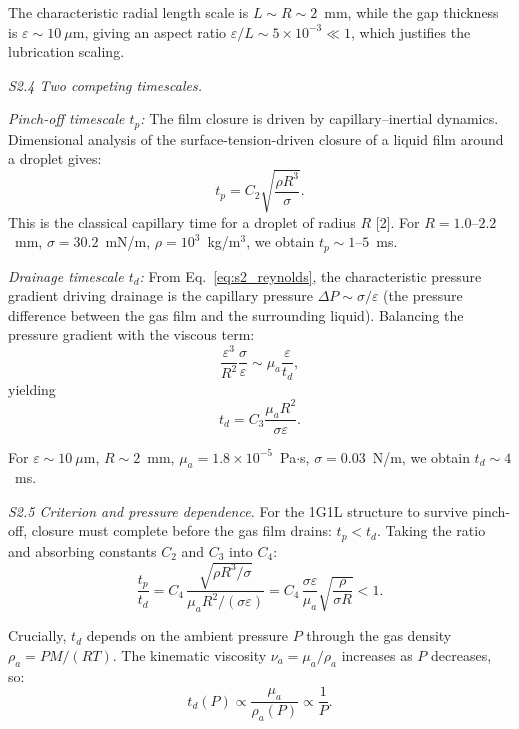 \documentclass[%
 preprint,
 superscriptaddress,
 amsmath,amssymb,
 aps, prl,
]{revtex4-2}
\begin{document}
The characteristic radial length scale is $L \sim R \sim 2$~mm, while the gap thickness is $\varepsilon \sim 10~\mu\text{m}$, giving an aspect ratio $\varepsilon/L \sim 5\times10^{-3} \ll 1$, which justifies the lubrication scaling.\par

{\noindent\textit{S2.4 Two competing timescales.}}

\textit{Pinch-off timescale $t_p$:} The film closure is driven by capillary--inertial dynamics. Dimensional analysis of the surface-tension-driven closure of a liquid film around a droplet gives:
\begin{equation}
t_p = C_2 \sqrt{\frac{\rho R^3}{\sigma}}.
\label{eq:s2_tp}
\end{equation}
This is the classical capillary time for a droplet of radius $R$ [2]. For $R = 1.0$--$2.2$~mm, $\sigma = 30.2$~mN/m, $\rho = 10^3$~kg/m$^3$, we obtain $t_p \sim 1$--$5$~ms.\par

\textit{Drainage timescale $t_d$:} From Eq.~\eqref{eq:s2_reynolds}, the characteristic pressure gradient driving drainage is the capillary pressure $\Delta P \sim \sigma/\varepsilon$ (the pressure difference between the gas film and the surrounding liquid). Balancing the pressure gradient with the viscous term:
\begin{equation}
\frac{\varepsilon^3}{R^2} \frac{\sigma}{\varepsilon} \sim \mu_a \frac{\varepsilon}{t_d},
\end{equation}
yielding
\begin{equation}
t_d = C_3 \frac{\mu_a R^2}{\sigma \varepsilon}.
\label{eq:s2_td}
\end{equation}

For $\varepsilon \sim 10~\mu\text{m}$, $R \sim 2$~mm, $\mu_a = 1.8\times10^{-5}$~Pa$\cdot$s, $\sigma = 0.03$~N/m, we obtain $t_d \sim 4$~ms.\par

{\noindent\textit{S2.5 Criterion and pressure dependence.}}
For the 1G1L structure to survive pinch-off, closure must complete before the gas film drains: $t_p < t_d$. Taking the ratio and absorbing constants $C_2$ and $C_3$ into $C_4$:
\begin{equation}
\frac{t_p}{t_d} = C_4\,
\frac{\sqrt{\rho R^3/\sigma}}{\mu_a R^2/(\sigma\varepsilon)}
= C_4\,\frac{\sigma\varepsilon}{\mu_a}\sqrt{\frac{\rho}{\sigma R}}
< 1.
\label{eq:s2_criterion}
\end{equation}

Crucially, $t_d$ depends on the ambient pressure $P$ through the gas density $\rho_a = P M/(RT)$. The kinematic viscosity $\nu_a = \mu_a/\rho_a$ increases as $P$ decreases, so:
\begin{equation}
t_d(P) \propto \frac{\mu_a}{\rho_a(P)} \propto \frac{1}{P}.
\end{equation}
\end{document}
